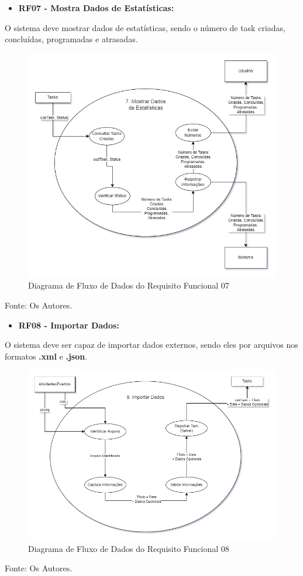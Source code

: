 \documentclass[a4paper,12pt]{article}
\begin{document}
\pagebreak
\begin{itemize}
\item\textbf{RF07 - Mostra Dados de Estatísticas:}
\end{itemize}

O sistema deve mostrar dados de estatísticas, sendo o número de task criadas, concluídas, programadas e atrasadas.
\begin{figure}[H]
	\centering
	\includegraphics[scale=0.45]{DFDs/RF07.drawio.png}
	\caption{Diagrama de Fluxo de Dados do Requisito Funcional 07}
\end{figure}
\noindent Fonte: Os Autores.

\pagebreak
\begin{itemize}
\item\textbf{RF08 - Importar Dados:}
\end{itemize}

O sistema deve ser capaz de importar dados externos, sendo eles por arquivos nos formatos \textbf{.xml} e \textbf{.json}.
\begin{figure}[H]
	\centering
	\includegraphics[scale=0.45]{DFDs/RF08.drawio.png}
	\caption{Diagrama de Fluxo de Dados do Requisito Funcional 08}
\end{figure}
\noindent Fonte: Os Autores.
\end{document}
